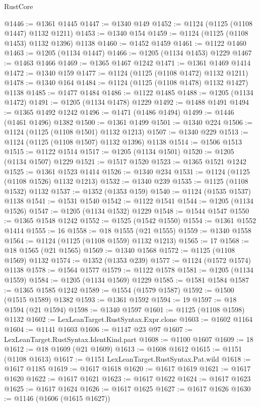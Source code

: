 \begin{lexlean}{RustCore}
\begin{coremodule}
@1446 := @1361 @1445
@1447 := @1340 @149
@1452 := @1124 (@1125 (@1108 @1447) @1132 @1211)
@1453 := @1340 @154
@1459 := @1124 (@1125 (@1108 @1453) @1132 @1396) @1138
@1460 := @1452 @1459
@1461 := @1122 @1460
@1463 := @1205 (@1134 @1447)
@1466 := @1205 (@1134 @1453) @1229
@1467 := @1463 @1466
@1469 := @1365 @1467 @1242
@1471 := @1361 @1469 @1414
@1472 := @1340 @159
@1477 := @1124 (@1125 (@1108 @1472) @1132 @1211)
@1478 := @1340 @164
@1484 := @1124 (@1125 (@1108 @1478) @1132 @1427) @1138
@1485 := @1477 @1484
@1486 := @1122 @1485
@1488 := @1205 (@1134 @1472)
@1491 := @1205 (@1134 @1478) @1229
@1492 := @1488 @1491
@1494 := @1365 @1492 @1242
@1496 := @1471 (@1486 @1494)
@1499 := @1446 (@1461 @1496) @1382
@1500 := @1361 @1499
@1501 := @1340 @224
@1506 := @1124 (@1125 (@1108 @1501) @1132 @1213)
@1507 := @1340 @229
@1513 := @1124 (@1125 (@1108 @1507) @1132 @1396) @1138
@1514 := @1506 @1513
@1515 := @1122 @1514
@1517 := @1205 (@1134 @1501)
@1520 := @1205 (@1134 @1507) @1229
@1521 := @1517 @1520
@1523 := @1365 @1521 @1242
@1525 := @1361 @1523 @1414
@1526 := @1340 @234
@1531 := @1124 (@1125 (@1108 @1526) @1132 @1213)
@1532 := @1340 @239
@1535 := @1125 (@1108 @1532) @1132
@1537 := @1352 (@1353 @159)
@1540 := @1124 (@1535 @1537) @1138
@1541 := @1531 @1540
@1542 := @1122 @1541
@1544 := @1205 (@1134 @1526)
@1547 := @1205 (@1134 @1532) @1229
@1548 := @1544 @1547
@1550 := @1365 @1548 @1242
@1552 := @1525 (@1542 @1550)
@1554 := @1361 @1552 @1414
@1555 := 16
@1558 := @18 @1555 (@21 @1555)
@1559 := @1340 @1558
@1564 := @1124 (@1125 (@1108 @1559) @1132 @1213)
@1565 := 17
@1568 := @18 @1565 (@21 @1565)
@1569 := @1340 @1568
@1572 := @1125 (@1108 @1569) @1132
@1574 := @1352 (@1353 @239)
@1577 := @1124 (@1572 @1574) @1138
@1578 := @1564 @1577
@1579 := @1122 @1578
@1581 := @1205 (@1134 @1559)
@1584 := @1205 (@1134 @1569) @1229
@1585 := @1581 @1584
@1587 := @1365 @1585 @1242
@1589 := @1554 (@1579 @1587)
@1592 := @1500 (@1515 @1589) @1382
@1593 := @1361 @1592
@1594 := 19
@1597 := @18 @1594 (@21 @1594)
@1598 := @1340 @1597
@1601 := @1125 (@1108 @1598) @1132
@1602 := LexLeanTarget.RustSyntax.Expr.clone
@1603 := @1602 @1164
@1604 := @1141 @1603
@1606 := @1147 @23 @97
@1607 := LexLeanTarget.RustSyntax.IdentKind.part
@1608 := @1100 @1607
@1609 := 18
@1612 := @18 @1609 (@21 @1609)
@1613 := @1608 @1612
@1615 := @1151 (@1108 @1613)
@1617 := @1151 LexLeanTarget.RustSyntax.Pat.wild
@1618 := @1617 @1185
@1619 := @1617 @1618
@1620 := @1617 @1619
@1621 := @1617 @1620
@1622 := @1617 @1621
@1623 := @1617 @1622
@1624 := @1617 @1623
@1625 := @1617 @1624
@1626 := @1617 @1625
@1627 := @1617 @1626
@1630 := @1146 (@1606 (@1615 @1627))

\end{coremodule}
\end{lexlean}
